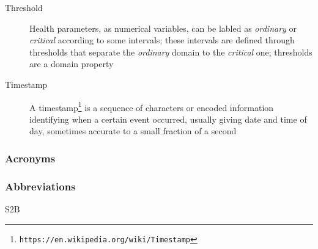 \documentclass[12pt]{article}
\begin{document}
\begin{description}
        \item[Threshold] Health parameters, as numerical variables, can be labled as \textit{ordinary} or \textit{critical} according to some intervals; these intervals are defined through thresholds that separate the \textit{ordinary} domain to the \textit{critical} one; thresholds are a domain property
        \item[Timestamp] A timestamp\footnote{\texttt{https://en.wikipedia.org/wiki/Timestamp}} is a sequence of characters or encoded information identifying when a certain event occurred, usually giving date and time of day, sometimes accurate to a small fraction of a second
      \end{description}

    \subsubsection{Acronyms}

      \begin{description}
        \item[] %
      \end{description}

    \subsubsection{Abbreviations}

      \begin{description}
        \item[S2B] %
      \end{description}
\end{document}
